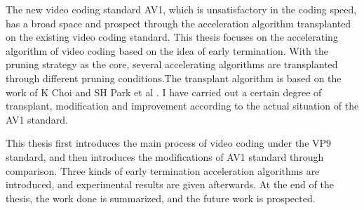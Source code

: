 
\begin{eabstract}

  The new video coding standard AV1, which is unsatisfactory in the coding speed, has a broad space 
  and prospect through the acceleration algorithm transplanted on the existing video coding standard.
  This thesis focuses on the accelerating algorithm of video coding based on the idea of early termination. 
  With the pruning strategy as the core, several accelerating algorithms are transplanted through 
  different pruning conditions.The transplant algorithm is based on the work of K Choi and 
  SH Park et al \cite{choi2011coding}. I have carried out a certain degree of transplant, 
  modification and improvement according to the actual situation of the AV1 standard.
  
  This thesis first introduces the main process of video coding under the VP9 standard, and then 
  introduces the modifications of AV1 standard through comparison. Three kinds of early termination 
  acceleration algorithms are introduced, and experimental results are given afterwards. 
  At the end of the thesis, the work done is summarized, and the future work is prospected.

\end{eabstract}

